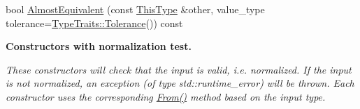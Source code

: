 \begin{DoxyCompactItemize}
\item 
bool \hyperlink{classvct_matrix_rotation2_base_aa5ab58d84256201af2c8a019e87121b3}{Almost\+Equivalent} (const \hyperlink{classvct_matrix_rotation2_base_a47ffeef2ddecede4b16bcc88fb432ff5}{This\+Type} \&other, value\+\_\+type tolerance=\hyperlink{classcmn_type_traits_adc129bf9867295b90d300768b780fa99}{Type\+Traits\+::\+Tolerance}()) const 
\end{DoxyCompactItemize}
\begin{Indent}{\bf Constructors with normalization test.}\par
{\em These constructors will check that the input is valid, i.\+e. normalized. If the input is not normalized, an exception (of type {\ttfamily std\+::runtime\+\_\+error}) will be thrown. Each constructor uses the corresponding \hyperlink{classvct_matrix_rotation2_base_a73d45665d2dd263429022f275f04b983}{From()} method based on the input type.

}
\end{Indent}
